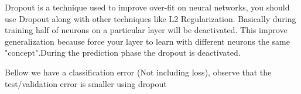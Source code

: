 \documentclass[11pt]{article}
\begin{document}
 Dropout is a technique used to improve over-fit on neural networks, you
should use Dropout along with other techniques like L2 Regularization.
Basically during training half of neurons on a particular layer will be
deactivated. This improve generalization because force your layer to
learn with different neurons the same "concept".During the prediction
phase the dropout is deactivated.

 Bellow we have a classification error (Not including loss), observe
that the test/validation error is smaller using dropout 


    
    
    
    
\end{document}

